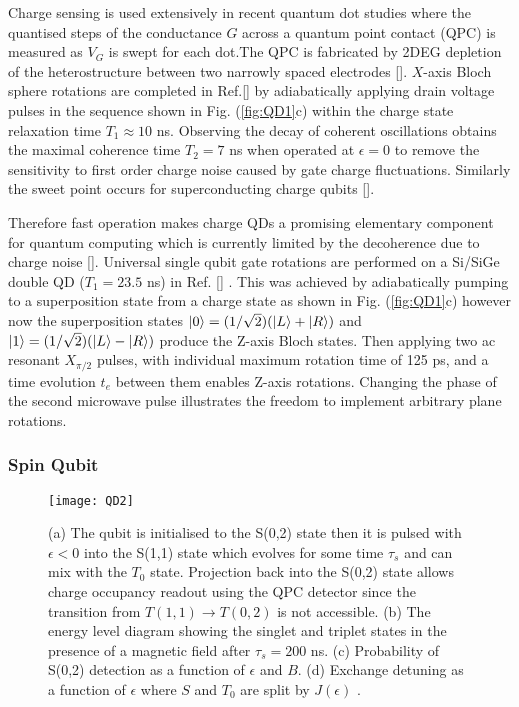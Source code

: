 Charge sensing is used extensively in recent quantum dot studies where the quantised steps of the conductance $G$ across a quantum point contact (QPC) is measured as $V_{G}$ is swept for each dot.The QPC is fabricated by 2DEG depletion of the heterostructure between two narrowly spaced electrodes []. $X$-axis Bloch sphere rotations are completed in Ref.[] by adiabatically applying drain voltage pulses in the sequence shown in Fig. (\ref{fig:QD1}c) within the charge state relaxation time $T_{1} \approx 10$ ns. Observing the decay of coherent oscillations obtains the maximal coherence time $T_{2}=7$ ns when operated at $\epsilon=0$ to remove the sensitivity to first order charge noise caused by gate charge fluctuations. Similarly the sweet point occurs for superconducting charge qubits []. 

Therefore fast operation makes charge QDs a promising elementary component for quantum computing which is currently limited by the decoherence due to charge noise []. Universal single qubit gate rotations are performed on a Si/SiGe double QD ($T_{1}=23.5$ ns) in Ref. [] . This was achieved by adiabatically pumping to a superposition state from a charge state as shown in Fig. (\ref{fig:QD1}c) however now the superposition states $\lvert0\rangle=(1/\sqrt{2})(\lvert L\rangle+\lvert R\rangle)$ and $\lvert1\rangle=(1/\sqrt{2})(\lvert L\rangle-\lvert R\rangle)$ produce the Z-axis Bloch states. Then applying two ac resonant $X_{\pi/2}$ pulses, with individual maximum rotation time of 125 ps, and a time evolution $t_{e}$ between them enables Z-axis rotations. Changing the phase of the second microwave pulse illustrates the freedom to implement arbitrary plane rotations.  
   

\subsubsection{Spin Qubit}

\begin{figure}[b]
\centering
\texttt{[image: QD2]}
\caption{\label{fig:QD2} (a) The qubit is initialised to the S(0,2) state then it is pulsed with $\epsilon < 0$ into the S(1,1) state which evolves for some time $\tau_{s}$ and can mix with the $T_{0}$ state. Projection back into the S(0,2) state allows charge occupancy readout using the QPC detector since the transition from $T(1,1) \rightarrow T(0,2)$ is not accessible. (b) The energy level diagram showing the singlet and triplet states in the presence of a magnetic field after $\tau_{s} =200$ ns. (c) Probability of S(0,2) detection as a function of $\epsilon$ and $B$. (d) Exchange detuning as a function of $\epsilon$ where $S$ and $T_{0}$ are split by $J(\epsilon)$  \citep{Petta2005CoherentDots}.}
\end{figure}

